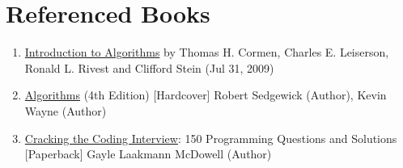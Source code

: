 \documentclass[letterpaper]{article}
\begin{document}
\section{Referenced Books}
\begin{enumerate}
\item \href{http://www.amazon.com/Thomas-H.-Cormen/e/B000AQ24AS}{Introduction to Algorithms} by Thomas H. Cormen, Charles E. Leiserson, Ronald L. Rivest and Clifford Stein (Jul 31, 2009)
\item \href{http://www.amazon.com/Algorithms-4th-Robert-Sedgewick/dp/032157351X/ref=sr_1_1?s=books&ie=UTF8&qid=1381401589&sr=1-1&keywords=algorithms+sedgewick+4th+edition}{Algorithms} (4th Edition) [Hardcover]
Robert Sedgewick (Author), Kevin Wayne (Author)
\item \href{http://www.amazon.com/Cracking-Coding-Interview-Programming-Questions/dp/098478280X/ref=sr_1_1?s=books&ie=UTF8&qid=1381401682&sr=1-1&keywords=cracking+the+coding+interview}{Cracking the Coding Interview}: 150 Programming Questions and Solutions [Paperback]
Gayle Laakmann McDowell (Author)


\end{enumerate}
\end{document}
